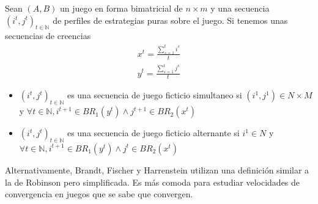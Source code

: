 \begin{definition} \label{def:fp:brown}
    Sean $(A, B)$ un juego en forma bimatricial de $n \times m$ y una secuencia $(i^t, j^t)_{t \in \mathbb{N}}$ de perfiles de estrategias puras sobre el juego. Si tenemos unas secuencias de creencias
    \begin{gather}
        x^t= \frac{\sum^t_{s=1} i^s}{t}  \\
        y^t= \frac{\sum^t_{s=1} j^s}{t}
    \end{gather}
    \begin{itemize}
        \item $(i^t, j^t)_{t \in \mathbb{N}}$ es una secuencia de juego ficticio simultaneo si $(i^1, j^1) \in N \times M$ y $\forall t \in \mathbb{N}, i^{t+1} \in BR_1(y^t) \land j^{t+1} \in BR_2(x^t)$
        \item $(i^t, j^t)_{t \in \mathbb{N}}$ es una secuencia de juego ficticio alternante si $i^1 \in N$ y $\forall t \in \mathbb{N}, i^{t+1} \in BR_1(y^t) \land j^{t} \in BR_2(x^t)$
    \end{itemize}
\end{definition}


Alternativamente, Brandt, Fischer y Harrenstein utilizan una definición similar a la de Robinson \cite{robinson:zerosum} pero simplificada. Es más comoda para estudiar velocidades de convergencia en juegos que se sabe que convergen.

